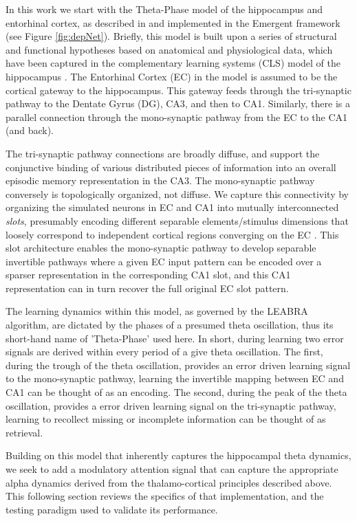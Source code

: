 \documentclass[11pt, titlepage, twoside]{article}
\begin{document}
In this work we start with the Theta-Phase model of the hippocampus and entorhinal cortex, as described in \textcite{KetzMorkondaOReilly13} and implemented in the Emergent framework \cite{AisaMingusOReilly08} (see Figure \ref{fig:depNet}).  Briefly, this model is built upon a series of structural and functional hypotheses based on anatomical and physiological data, which have been captured in the complementary learning systems (CLS) model of the hippocampus \cite{McClellandMcNaughtonOReilly95, NormanOReilly03}. The Entorhinal Cortex (EC) in the model is assumed to be the cortical gateway to the hippocampus.  This gateway feeds through the tri-synaptic pathway to the Dentate Gyrus (DG), CA3, and then to CA1.  Similarly, there is a parallel connection through the mono-synaptic pathway from the EC to the CA1 (and back).

The tri-synaptic pathway connections are broadly diffuse, and support the conjunctive binding of various distributed pieces of information into an overall episodic memory representation in the CA3. The mono-synaptic pathway conversely is topologically organized, not diffuse.  We capture this connectivity by organizing the simulated neurons in EC and CA1 into mutually interconnected {\em slots}, presumably encoding different separable elements/stimulus dimensions that loosely correspond to independent cortical regions converging on the EC \cite{Witter10}.  This slot architecture enables the mono-synaptic pathway to develop separable invertible pathways where a given EC input pattern can be encoded over a sparser representation in the corresponding CA1 slot, and this CA1 representation can in turn recover the full original EC slot pattern. 

The learning dynamics within this model, as governed by the LEABRA algorithm, are dictated by the phases of a presumed theta oscillation, thus its short-hand name of 'Theta-Phase' used here. In short, during learning two error signals are derived within every period of a give theta oscillation.  The first, during the trough of the theta oscillation, provides an error driven learning signal to the mono-synaptic pathway, learning the invertible mapping between EC and CA1 can be thought of as an encoding.  The second, during the peak of the theta oscillation, provides a error driven learning signal on the tri-synaptic pathway, learning to recollect missing or incomplete information can be thought of as retrieval.  

Building on this model that inherently captures the hippocampal theta dynamics, we seek to add a modulatory attention signal that can capture the appropriate alpha dynamics derived from the thalamo-cortical principles described above.  This following section reviews the specifics of that implementation, and the testing paradigm used to validate its performance.
\end{document}
